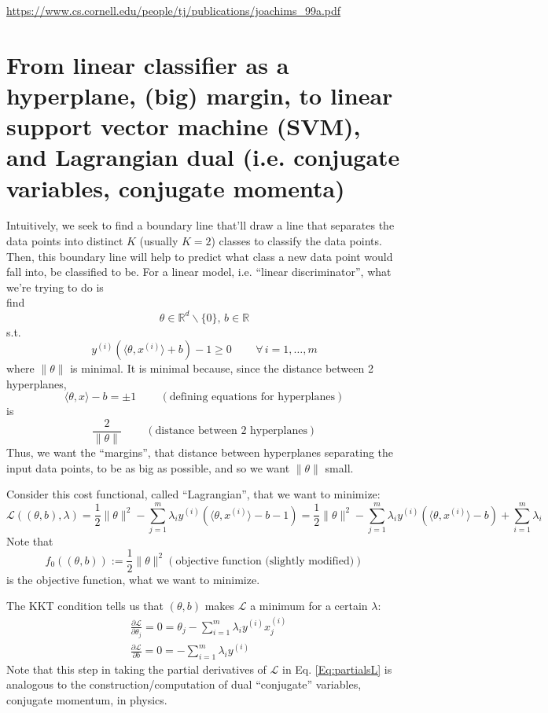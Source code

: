 \documentclass[10pt]{amsart}
\begin{document}
\begin{multicols*}{2}
\url{https://www.cs.cornell.edu/people/tj/publications/joachims_99a.pdf}

\section{From linear classifier as a hyperplane, (big) margin, to linear support vector machine (SVM), and Lagrangian dual (i.e. conjugate variables, conjugate momenta)}

Intuitively, we seek to find a boundary line that'll draw a line that separates the data points into distinct $K$ (usually $K=2$) classes to classify the data points.  Then, this boundary line will help to predict what class a new data point would fall into, be classified to be.  For a linear model, i.e. ``linear discriminator'', what we're trying to do is \\

find
\[
\theta \in \mathbb{R}^d \backslash \lbrace 0 \rbrace ,\, b\in \mathbb{R}
\]
s.t.
\begin{equation}
  y^{(i)}(\langle \theta,x^{(i)} \rangle + b) - 1 \geq 0 \qquad\, \forall \, i = 1, \dots, m 
\end{equation}
where $\| \theta \|$ is minimal.  It is minimal because, since the distance between 2 hyperplanes,
\[
\langle \theta, x\rangle - b = \pm 1 \qquad \, (\text{defining equations for hyperplanes})
\]
is
\[
\frac{2}{\|\theta\|} \qquad \, (\text{distance between 2 hyperplanes})
\]
Thus, we want the ``margins'', that distance between hyperplanes separating the input data points, to be as big as possible, and so we want $\|\theta\|$ small.

Consider this cost functional, called ``Lagrangian'', that we want to minimize:
\begin{equation}\label{Eq:costLagrangian}
  \mathcal{L}((\theta,b),\lambda) = \frac{1}{2} \| \theta\|^2 - \sum_{j=1}^m \lambda_i y^{(i)}(\langle \theta, x^{(i)} \rangle - b - 1)   =  \frac{1}{2} \| \theta\|^2 - \sum_{j=1}^m \lambda_i y^{(i)}(\langle \theta, x^{(i)} \rangle - b) +\sum_{i=1}^m \lambda_i 
  \end{equation}
Note that
\begin{equation}
f_0((\theta,b)) := \frac{1}{2} \| \theta \|^2 (\text{objective function (slightly modified)})
\end{equation}
is the objective function, what we want to minimize.

The KKT condition tells us that $(\theta,b)$ makes $\mathcal{L}$ a minimum for a certain $\lambda$:
\begin{equation}\label{Eq:partialsL}
  \begin{aligned}
    & \frac{ \partial \mathcal{L}}{ \partial \theta_j} = 0 = \theta_j - \sum_{i=1}^m \lambda_i y^{(i)} x_j^{(i)} \\ 
    & \frac{ \partial \mathcal{L}}{ \partial b} = 0 = -\sum_{i=1}^m \lambda_i y^{(i)}
    \end{aligned}
  \end{equation}
Note that this step in taking the partial derivatives of $\mathcal{L}$ in Eq. \ref{Eq:partialsL} is analogous to the construction/computation of dual ``conjugate'' variables, conjugate momentum, in physics.  


\end{multicols*}
\end{document}
